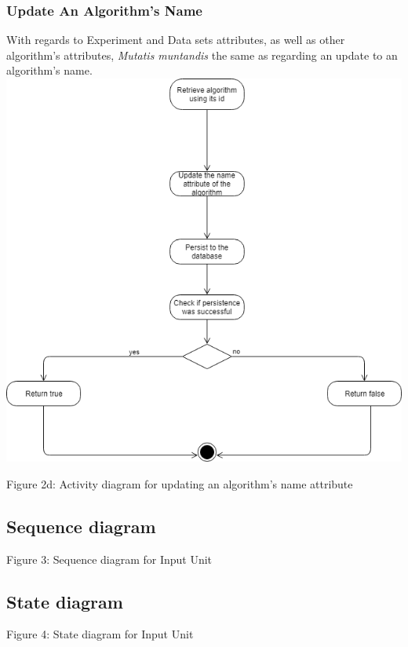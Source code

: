     \subsubsection{Update An Algorithm's Name}
    \par With regards to Experiment and Data sets attributes, as well as other algorithm's attributes,
{ \textit{Mutatis muntandis} the same as regarding an update to an algorithm's name.} \newline \newline
    \includegraphics[width=\textwidth]{input_unit/images/update_algorithm_activity_diagram.png}
	\begin{center}
	    \small{Figure 2d: Activity diagram for updating an algorithm's name attribute }
    \end{center}


\subsection{Sequence diagram}
	\begin{center}
	    \small{Figure 3: Sequence diagram for Input Unit}
    \end{center}

\subsection{State diagram}
	\begin{center}
	    \small{Figure 4: State diagram for Input Unit}
    \end{center}

